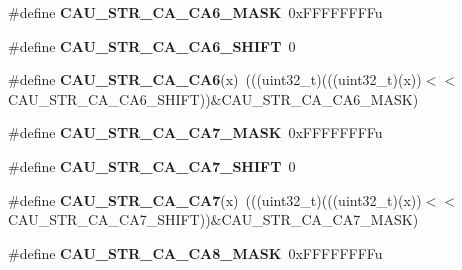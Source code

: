 \begin{DoxyCompactItemize}
\item 
\#define {\bfseries C\+A\+U\+\_\+\+S\+T\+R\+\_\+\+C\+A\+\_\+\+C\+A6\+\_\+\+M\+A\+SK}~0x\+F\+F\+F\+F\+F\+F\+F\+Fu\hypertarget{group__CAU__Register__Masks_ga7b5a1caf333ef375bf06cd83702a2f52}{}\label{group__CAU__Register__Masks_ga7b5a1caf333ef375bf06cd83702a2f52}

\item 
\#define {\bfseries C\+A\+U\+\_\+\+S\+T\+R\+\_\+\+C\+A\+\_\+\+C\+A6\+\_\+\+S\+H\+I\+FT}~0\hypertarget{group__CAU__Register__Masks_ga2d6d9fbc55d31a3abf405b19663984fd}{}\label{group__CAU__Register__Masks_ga2d6d9fbc55d31a3abf405b19663984fd}

\item 
\#define {\bfseries C\+A\+U\+\_\+\+S\+T\+R\+\_\+\+C\+A\+\_\+\+C\+A6}(x)~(((uint32\+\_\+t)(((uint32\+\_\+t)(x))$<$$<$C\+A\+U\+\_\+\+S\+T\+R\+\_\+\+C\+A\+\_\+\+C\+A6\+\_\+\+S\+H\+I\+FT))\&C\+A\+U\+\_\+\+S\+T\+R\+\_\+\+C\+A\+\_\+\+C\+A6\+\_\+\+M\+A\+SK)\hypertarget{group__CAU__Register__Masks_ga2ec9833172e8d38e73afcb75f0e7763a}{}\label{group__CAU__Register__Masks_ga2ec9833172e8d38e73afcb75f0e7763a}

\item 
\#define {\bfseries C\+A\+U\+\_\+\+S\+T\+R\+\_\+\+C\+A\+\_\+\+C\+A7\+\_\+\+M\+A\+SK}~0x\+F\+F\+F\+F\+F\+F\+F\+Fu\hypertarget{group__CAU__Register__Masks_ga71cb093a615f022bab07fea3386b14c4}{}\label{group__CAU__Register__Masks_ga71cb093a615f022bab07fea3386b14c4}

\item 
\#define {\bfseries C\+A\+U\+\_\+\+S\+T\+R\+\_\+\+C\+A\+\_\+\+C\+A7\+\_\+\+S\+H\+I\+FT}~0\hypertarget{group__CAU__Register__Masks_ga438fb9b2bcfb9ce4ff046f9cf3fb12e2}{}\label{group__CAU__Register__Masks_ga438fb9b2bcfb9ce4ff046f9cf3fb12e2}

\item 
\#define {\bfseries C\+A\+U\+\_\+\+S\+T\+R\+\_\+\+C\+A\+\_\+\+C\+A7}(x)~(((uint32\+\_\+t)(((uint32\+\_\+t)(x))$<$$<$C\+A\+U\+\_\+\+S\+T\+R\+\_\+\+C\+A\+\_\+\+C\+A7\+\_\+\+S\+H\+I\+FT))\&C\+A\+U\+\_\+\+S\+T\+R\+\_\+\+C\+A\+\_\+\+C\+A7\+\_\+\+M\+A\+SK)\hypertarget{group__CAU__Register__Masks_gadbfbc657f2fb34b2788cf7ebda86238e}{}\label{group__CAU__Register__Masks_gadbfbc657f2fb34b2788cf7ebda86238e}

\item 
\#define {\bfseries C\+A\+U\+\_\+\+S\+T\+R\+\_\+\+C\+A\+\_\+\+C\+A8\+\_\+\+M\+A\+SK}~0x\+F\+F\+F\+F\+F\+F\+F\+Fu\hypertarget{group__CAU__Register__Masks_ga841925012949d7e6ee56bffe7c3ccc34}{}\label{group__CAU__Register__Masks_ga841925012949d7e6ee56bffe7c3ccc34}


\end{DoxyCompactItemize}
